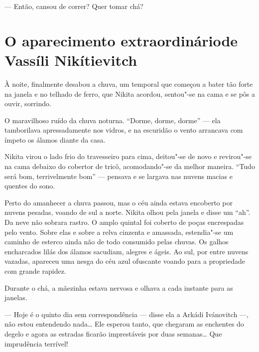
\enlargethispage{\baselineskip}

--- Então, cansou de correr? Quer tomar chá?

\chapter{O aparecimento extraordinário\break de Vassíli Nikítievitch}

À noite, finalmente desabou a chuva, um temporal que começou a bater tão
forte na janela e no telhado de ferro, que Nikita acordou, sentou"-se na
cama e se pôs a ouvir, sorrindo.

O maravilhoso ruído da chuva noturna. ``Dorme, dorme, dorme'' --- ela
tamborilava apressadamente nos vidros, e na escuridão o vento arrancava
com ímpeto os álamos diante da casa.

Nikita virou o lado frio do travesseiro para cima, deitou"-se de novo e
revirou"-se na cama debaixo do cobertor de tricô, acomodando"-se da melhor
maneira. ``Tudo será bom, terrivelmente bom'' --- pensava e se largava
nas nuvens macias e quentes do sono.

Perto do amanhecer a chuva passou, mas o céu ainda estava encoberto por
nuvens pesadas, voando de sul a norte. Nikita olhou pela janela e disse
um ``ah''. Da neve não sobrara rastro. O amplo quintal foi coberto de
poças encrespadas pelo vento. Sobre elas e sobre a relva cinzenta e
amassada, estendia"-se um caminho de esterco ainda não de todo consumido
pelas chuvas. Os galhos encharcados lilás dos álamos sacudiam, alegres e
ágeis. Ao sul, por entre nuvens vazadas, apareceu uma nesga do céu azul
ofuscante voando para a propriedade com grande rapidez.

Durante o chá, a mãezinha estava nervosa e olhava a cada instante para
as janelas.

--- Hoje é o quinto dia sem correspondência --- disse ela a Arkádi
Ivánovitch ---, não estou entendendo nada\ldots{} Ele esperou tanto, que
chegaram as enchentes do degelo e agora as estradas ficarão imprestáveis
por duas semanas\ldots{} Que imprudência terrível!

